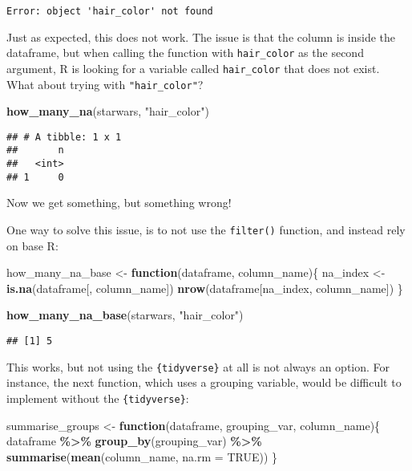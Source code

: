 \documentclass[
]{article}
\newenvironment{Shaded}{\begin{snugshade}}{\end{snugshade}}
\newcommand{\ControlFlowTok}[1]{\textcolor[rgb]{0.13,0.29,0.53}{\textbf{#1}}}
\newcommand{\DataTypeTok}[1]{\textcolor[rgb]{0.13,0.29,0.53}{#1}}
\newcommand{\KeywordTok}[1]{\textcolor[rgb]{0.13,0.29,0.53}{\textbf{#1}}}
\newcommand{\NormalTok}[1]{#1}
\newcommand{\OperatorTok}[1]{\textcolor[rgb]{0.81,0.36,0.00}{\textbf{#1}}}
\newcommand{\OtherTok}[1]{\textcolor[rgb]{0.56,0.35,0.01}{#1}}
\newcommand{\StringTok}[1]{\textcolor[rgb]{0.31,0.60,0.02}{#1}}
\begin{document}
\begin{verbatim}
Error: object 'hair_color' not found
\end{verbatim}

Just as expected, this does not work. The issue is that the column is inside the dataframe,
but when calling the function with \texttt{hair\_color} as the second argument, R is looking for a
variable called \texttt{hair\_color} that does not exist. What about trying with \texttt{"hair\_color"}?

\begin{Shaded}
\begin{Highlighting}[]
\KeywordTok{how\_many\_na}\NormalTok{(starwars, }\StringTok{"hair\_color"}\NormalTok{)}
\end{Highlighting}
\end{Shaded}

\begin{verbatim}
## # A tibble: 1 x 1
##       n
##   <int>
## 1     0
\end{verbatim}

Now we get something, but something wrong!

One way to solve this issue, is to not use the \texttt{filter()} function, and instead rely on base R:

\begin{Shaded}
\begin{Highlighting}[]
\NormalTok{how\_many\_na\_base \textless{}{-}}\StringTok{ }\ControlFlowTok{function}\NormalTok{(dataframe, column\_name)\{}
\NormalTok{  na\_index \textless{}{-}}\StringTok{ }\KeywordTok{is.na}\NormalTok{(dataframe[, column\_name])}
  \KeywordTok{nrow}\NormalTok{(dataframe[na\_index, column\_name])}
\NormalTok{\}}

\KeywordTok{how\_many\_na\_base}\NormalTok{(starwars, }\StringTok{"hair\_color"}\NormalTok{)}
\end{Highlighting}
\end{Shaded}

\begin{verbatim}
## [1] 5
\end{verbatim}

This works, but not using the \texttt{\{tidyverse\}} at all is not always an option. For instance,
the next function, which uses a grouping variable, would be difficult to implement without the
\texttt{\{tidyverse\}}:

\begin{Shaded}
\begin{Highlighting}[]
\NormalTok{summarise\_groups \textless{}{-}}\StringTok{ }\ControlFlowTok{function}\NormalTok{(dataframe, grouping\_var, column\_name)\{}
\NormalTok{  dataframe }\OperatorTok{\%\textgreater{}\%}
\StringTok{    }\KeywordTok{group\_by}\NormalTok{(grouping\_var) }\OperatorTok{\%\textgreater{}\%}\StringTok{  }
\StringTok{    }\KeywordTok{summarise}\NormalTok{(}\KeywordTok{mean}\NormalTok{(column\_name, }\DataTypeTok{na.rm =} \OtherTok{TRUE}\NormalTok{))}
\NormalTok{\}}
\end{Highlighting}
\end{Shaded}
\end{document}
